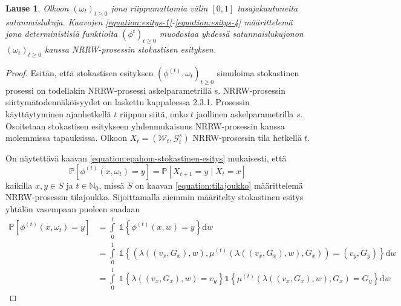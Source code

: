 \documentclass[finnish, 12pt, a4paper, sci, utf8, pdfa]{aaltothesis}
\newcommand{\N}{\mathbb{N}}
\newcommand{\Grandom}{\mathcal{G}}
\newcommand{\Wrandom}{\mathcal{W}}
\newcommand{\indicator}{\mathopen{\mathds{1}}}
\newcommand*{\prob}{\mathbb{P}}
\newtheorem{theorem}{Lause}
\begin{document}
\begin{theorem}
Olkoon $ (\omega_{t})_{t \geq 0} $ jono riippumattomia välin $ [0, 1] $ tasajakautuneita satunnaislukuja. Kaavojen \ref{equation:esitys-1}-\ref{equation:esitys-4} määrittelemä jono deterministisiä funktioita $ (\phi^{t})_{t \geq 0} $ muodostaa yhdessä satunnaislukujonon $ (\omega_{t})_{t \geq 0} $ kanssa NRRW-prosessin stokastisen esityksen.
\label{theorem:my-theorem}
\end{theorem}
\begin{proof}
Esitän, että stokastisen esityksen \( (\phi^{(t)}, \omega_{t})_{t \geq 0} \) simuloima stokastinen prosessi on todellakin NRRW-prosessi askelparametrillä s. NRRW-prosessin siirtymätodennäköisyydet on laskettu kappaleessa 2.3.1. Prosessin käyttäytyminen ajanhetkellä $ t $ riippuu siitä, onko $ t $ jaollinen askelparametrilla $ s $. Osoitetaan stokastisen esitykseen yhdenmukaisuus NRRW-prosessin kanssa molemmissa tapauksissa. Olkoon $ X_{t} = (\Wrandom_{t}, \Grandom^{s}_{t}) $ NRRW-prosessin tila hetkellä $ t $. 

On näytettävä kaavan \ref{equation:epahom-stokastinen-esitys} mukaisesti, että
\[
   \prob \left[ \phi^{(t)}(x, \omega_{t}) = y \right] = \prob \left[ X_{t+1} = y \mid X_{t} = x \right] 
\]
kaikilla $ x, y \in S $ ja $ t \in \N_{0} $, missä $ S $ on kaavan \ref{equation:tilajoukko} määrittelemä NRRW-prosessin tilajoukko. Sijoittamalla aiemmin määritelty stokastinen esitys yhtälön vasempaan puoleen saadaan
\begin{align*}
   \prob \left[ \phi^{(t)}(x, \omega_{t}) = y \right] &= \int\limits_0^1 \; \indicator \left\{ \phi^{(t)}(x, w) = y \right\} \mathrm{d}w \\
                                                &= \int\limits_0^1 \; \indicator \left\{ \left( \lambda\left( (v_{x}, G_{x}), w \right), \mu^{(t)} \left( \lambda\left( (v_{x}, G_{x}), w \right), G_{x} \right) \right) = (v_{y}, G_{y}) \right\} \mathrm{d}w \\
                                                &= \int\limits_0^1 \; \indicator \left\{ \lambda\left( (v_{x}, G_{x}), w \right) = v_{y} \right\} \indicator \left\{ \mu^{(t)} \left( \lambda\left( (v_{x}, G_{x}), w \right), G_{x} \right) = G_{y} \right\} \mathrm{d}w
\end{align*}


\end{proof}
\end{document}
